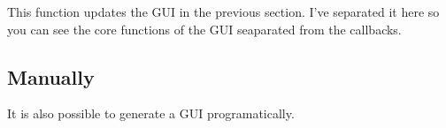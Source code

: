 \begin{quote}

\end{quote}

\pagebreak
This function updates the GUI in the previous section.
 I've separated it here so you can see the core functions of the GUI seaparated from the callbacks.

\begin{quote}

\end{quote}

\pagebreak
\subsection{Manually}
It is also possible to generate a GUI programatically.

\begin{quote}
 
\end{quote}

